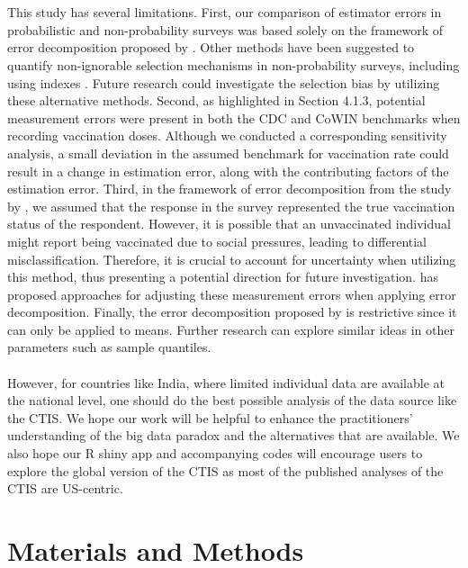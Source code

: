 \documentclass{article}
\begin{document}
\\
\\
This study has several limitations. First, our comparison of estimator errors in probabilistic and non-probability surveys was based solely on the framework of error decomposition proposed by \cite{Meng2018}. Other methods have been suggested to quantify non-ignorable selection mechanisms in non-probability surveys, including using indexes \citep{Andridge2019-bq, Little2020-zf, Boonstra2021-ji}. Future research could investigate the selection bias by utilizing these alternative methods. Second, as highlighted in Section 4.1.3, potential measurement errors were present in both the CDC and CoWIN benchmarks when recording vaccination doses. Although we conducted a corresponding sensitivity analysis, a small deviation in the assumed benchmark for vaccination rate could result in a change in estimation error, along with the contributing factors of the estimation error. Third, in the framework of error decomposition from the study by \cite{Meng2018}, we assumed that the response in the survey represented the true vaccination status of the respondent. However, it is possible that an unvaccinated individual might report being vaccinated due to social pressures, leading to differential misclassification. Therefore, it is crucial to account for uncertainty when utilizing this method, thus presenting a potential direction for future investigation. \cite{Dempsey2020} has proposed approaches for adjusting these measurement errors when applying error decomposition. Finally, the error decomposition proposed by \cite{Meng2018} is restrictive since it can only be applied to means. Further research can explore similar ideas in other parameters such as sample quantiles. 
\\
\\
However, for countries like India, where limited individual data are available at the national level, one should do the best possible analysis of the data source like the CTIS. We hope our work will be helpful to enhance the practitioners' understanding of the big data paradox and the alternatives that are available. We also hope our R shiny app and accompanying codes will encourage users to explore the global version of the CTIS as most of the published analyses of the CTIS are US-centric.

\section{Materials and Methods}
\end{document}
